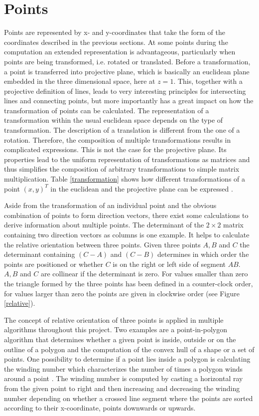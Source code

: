 \section{Points}

Points are represented by x- and y-coordinates that take the form of the coordinates described in the previous sections. At some points during the computation an extended representation is advantageous, particularly when points are being transformed, i.e. rotated or translated. Before a transformation, a point is transferred into projective plane, which is basically an euclidean plane embedded in the three dimensional space, here at $z = 1$. This, together with a projective definition of lines, leads to very interesting principles for intersecting lines and connecting points, but more importantly has a great impact on how the transformation of points can be calculated. The representation of a transformation within the usual euclidean space depends on the type of transformation. The description of a translation is different from the one of a rotation. Therefore, the composition of multiple transformations results in complicated expressions. This is not the case for the projective plane. Its properties lead to the uniform representation of transformations as matrices and thus simplifies the composition of arbitrary transformations to simple matrix multiplication. Table \ref{transformation} shows how different transformations of a point $(x, y)^{T}$ in the euclidean and the projective plane can be expressed \cite{richter11}.


Aside from the transformation of an individual point and the obvious combination of points to form direction vectors, there exist some calculations to derive information about multiple points. The determinant of the $2 \times 2$ matrix containing two direction vectors as columns is one example. It helps to calculate the relative orientation between three points. Given three points $A,B$ and $C$ the determinant containing $(C-A)$ and $(C-B)$ determines in which order the points are positioned or whether $C$ is on the right or left side of segment $AB$. $A,B$ and $C$ are collinear if the determinant is zero. For values smaller than zero the triangle formed by the three points has been defined in a counter-clock order, for values larger than zero the points are given in clockwise order (see Figure \ref{relative}).


The concept of relative orientation of three points is applied in multiple algorithms throughout this project. Two examples are a point-in-polygon algorithm that determines whether a given point is inside, outside or on the outline of a polygon and the computation of the convex hull of a shape or a set of points. One possibility to determine if a point lies inside a polygon is calculating the winding number which characterizes the number of times a polygon winds around a point \cite{hormann01}. The winding number is computed by casting a horizontal ray from the given point to right and then increasing and decreasing the winding number depending on whether a crossed line segment where the points are sorted according to their x-coordinate, points downwards or upwards.


